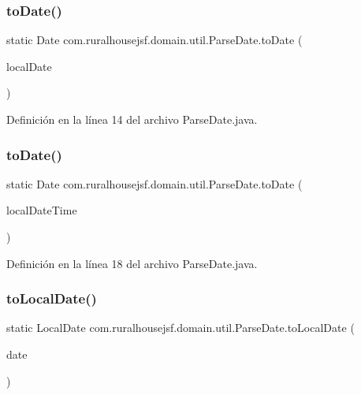 \subsubsection{\texorpdfstring{toDate()}{toDate()}\hspace{0.1cm}{\footnotesize\ttfamily [1/2]}}
{\footnotesize\ttfamily static Date com.\+ruralhousejsf.\+domain.\+util.\+Parse\+Date.\+to\+Date (\begin{DoxyParamCaption}\item[{Local\+Date}]{local\+Date }\end{DoxyParamCaption})\hspace{0.3cm}{\ttfamily [static]}}



Definición en la línea 14 del archivo Parse\+Date.\+java.

\mbox{\label{classcom_1_1ruralhousejsf_1_1domain_1_1util_1_1_parse_date_ade5cf2cc6741490bf01834ac0ebf9dfe}} 
\subsubsection{\texorpdfstring{toDate()}{toDate()}\hspace{0.1cm}{\footnotesize\ttfamily [2/2]}}
{\footnotesize\ttfamily static Date com.\+ruralhousejsf.\+domain.\+util.\+Parse\+Date.\+to\+Date (\begin{DoxyParamCaption}\item[{Local\+Date\+Time}]{local\+Date\+Time }\end{DoxyParamCaption})\hspace{0.3cm}{\ttfamily [static]}}



Definición en la línea 18 del archivo Parse\+Date.\+java.

\mbox{\label{classcom_1_1ruralhousejsf_1_1domain_1_1util_1_1_parse_date_ab162361ec67bde08f594d22c04ccc283}} 
\subsubsection{\texorpdfstring{toLocalDate()}{toLocalDate()}}
{\footnotesize\ttfamily static Local\+Date com.\+ruralhousejsf.\+domain.\+util.\+Parse\+Date.\+to\+Local\+Date (\begin{DoxyParamCaption}\item[{Date}]{date }\end{DoxyParamCaption})\hspace{0.3cm}{\ttfamily [static]}}



